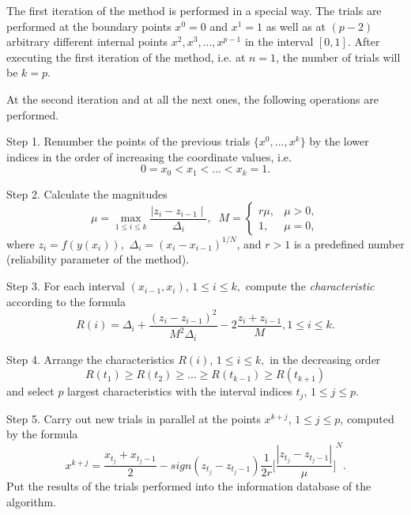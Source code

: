 \documentclass[runningheads]{llncs}
\begin{document}
The first iteration of the method is performed in a special way. The trials are performed at the boundary points $x^0 = 0$ and $x^1 = 1$ as well as at $(p-2)$ arbitrary different internal points $x^2, x^3, ..., x^{p-1}$ in the interval $[0,1]$.
After executing the first iteration of the method, i.e. at $n=1$, the number of trials will be $k=p$.

At the second iteration and at all the next ones, the following operations are performed.

Step 1. Renumber the points of the previous trials $\{x^0,...,x^k\}$ by the lower indices in the order of increasing the coordinate values, i.e. 
$$ 0 = x_0 < x_1 < ... < x_k = 1.$$

Step 2. Calculate the magnitudes 
\begin{equation}\label{M}
\mu = \max\limits_{1 \leq i \leq k} \frac{\mid z_i - z_{i-1} \mid}{\Delta_i}, \;\;
M = \left\{ \begin{array}{ll}
                r\mu, & \textrm{$\mu > 0$,}\\
                1, & \textrm{$\mu = 0$},
  \end{array} \right.
\end{equation}
where $z_i = f(y(x_i)),$  $\Delta_i = {(x_i - x_{i-1})}^{1/N}$, and $r > 1$ is a predefined number (reliability parameter of the method).

Step 3. For each interval $(x_{i-1}, x_i)$, $1 \leq i \leq k,$ compute the \textit{characteristic} according to the formula
\begin{equation}\label{R}
R(i) = \Delta_i + \frac{(z_i - z_{i-1})^2}{M^2 \Delta_i} - 2 \frac{z_i + z_{i-1}}{M}, 1 \leq i \leq k. 
\end{equation} 

Step 4. Arrange the characteristics $R(i)$, $1 \leq i \leq k,$ in the decreasing order
\begin{equation} \label{OrderedR}
 R(t_1) \geq R(t_2) \geq ... \geq R(t_{k-1}) \geq R(t_{k+1}) 
\end{equation}
and select $p$ largest characteristics with the interval indices $t_j$, $1 \leq j \leq p$.

Step 5. Carry out new trials in parallel at the points $x^{k+j}$, $1 \leq j \leq p$, computed by the formula
$$ x^{k+j} = \frac{x_{t_j} + x_{t_j - 1}}{2} - sign(z_{t_j} - z_{t_j - 1}) \frac{1}{2r} {\Bigg[\frac{\left| z_{t_j} - z_{t_j - 1} \right|}{\mu}\Bigg]}^{N}.$$
Put the results of the trials performed into the information database of the algorithm.
\end{document}
